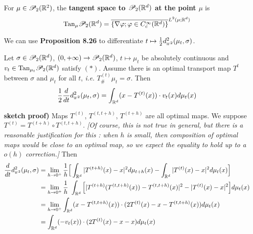\documentclass[12pt,a4paper]{article}
\newenvironment{proof}
{\begin{changemargin}{1cm}{0.5cm} 
	}%
	{\end{changemargin}
}
\newenvironment{p}
{\begin{proof} 
	}%
	{\end{proof}
}
\begin{document}
 For $\mu\in \mathscr{P}_2(\mathbb{R}^2)$, the \textbf{tangent space to $\mathscr{P}_2(\mathbb{R}^d)$ at the point $\mu$} is
\begin{align*}
\text{Tan}_{\mu} \mathscr{P}_2(\mathbb{R}^d) = \overline{ \{ \nabla \varphi ; \varphi \in C_c^{\infty}(\mathbb{R}^d)\}}^{L^2(\mu ; \mathbb{R}^d)}
\end{align*}
\s

We can use \textbf{Proposition 8.26} to differentiate $t\mapsto \frac{1}{2} \wa{2}^2(\mu_t, \sigma)$.
\s

 Let $\sigma \in \mathscr{P}_2(\mathbb{R}^d)$, $(0, + \infty) \rightarrow \mathscr{P}_2(\mathbb{R}^d)$, $t\mapsto \mu_t$ be absolutely continuous and $v_t \in \text{Tan}_{\mu_t} \mathscr{P}_2(\mathbb{R}^d)$ satisfy $(*)$. Assume there is an optimal transport map $T^{t}$ between $\sigma$ and $\mu_t$ for all $t$, \textit{i.e.} $T^{(t)}_{\#} \mu_t =\sigma$. Then
\begin{align*}
\frac{1}{2} \frac{d}{dt} \wa{2}^2 (\mu_t, \sigma) = \int_{\reals^d}(x- T^{(t)}(x))\cdot v_t(x) d\mu_t(x)
\end{align*}
\begin{p}
\textbf{sketch proof)} Maps $T^{(t)}$, $T^{(t, t+h)}$, $T^{(t+h)}$ are all optimal maps. We suppose $T^{(t)} = T^{(t+h)} \circ T^{(t, t+h)}$. \emph{[Of course, this is not true in general, but there is a reasonable justification for this : when $h$ is small, then composition of optimal maps would be close to an optimal map, so we expect the equality to hold up to a $o(h)$ correction.]} Then
\begin{align*}
\frac{d}{dt} \wa{2}^2 (\mu_t, \sigma) &= \lim_{h\rightarrow 0^+} \frac{1}{h} \Big[ \int_{\reals^d} |T^{(t+h)}(x) -x|^2  d\mu_{t+h}(x) - \int_{\reals^d} |T^{(t)}(x) - x|^2 d\mu_t(x) \Big] \\
&= \lim_{h\rightarrow 0^+} \frac{1}{h}  \ \int_{\reals^d} \Big[ | T^{(t+h)}(T^{(t, t+h)}(x)) - T^{(t, t+h)}(x) |^2 - |T^{(t)} (x) - x|^2  \Big] d\mu_t(x) \\
&= \lim_{h\rightarrow 0^+} \int_{\reals^d} (x- T^{(t, t+h)}(x)) \cdot (2T^{(t)}(x) - x - T^{(t, t+h)}(x)) d\mu_t(x) \\
&= \int_{\reals^d} (-v_t(x)) \cdot (2T^{(t)}(x) - x - x) d\mu_t(x)
\end{align*}
\eop
\end{p}
\end{document}
